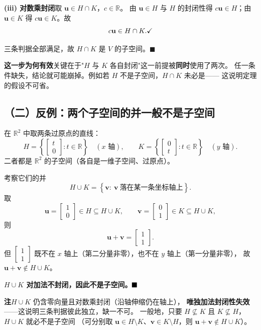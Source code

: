 \documentclass[11pt]{ctexart}
\newcommand{\R}{\mathbb{R}}
\newcommand{\0}{\mathbf{0}}
\begin{document}
\textbf{(iii) 对数乘封闭}\quad 取 $\mathbf u\in H\cap K$，$c\in\mathbb R$。
由 $\mathbf u\in H$ 与 $H$ 的封闭性得 $c\mathbf u\in H$；由 $\mathbf u\in K$ 得 $c\mathbf u\in K$。故
\[
c\mathbf u\in H\cap K . \hfill \checkmark
\]

三条判据全部满足，故 $H\cap K$ 是 $V$ 的子空间。\hfill$\blacksquare$

\begin{keybox}
\textbf{这一步为何有效}\quad 关键在于"$H$ 与 $K$ 各自封闭"这一前提被\textbf{同时}使用了两次。
任一条件缺失，结论就可能崩掉。例如若 $H$ 不是子空间，$H\cap K$ 未必是——
这说明定理的假设不可省。
\end{keybox}

\subsection*{（二）反例：两个子空间的并一般不是子空间}

在 $\R^2$ 中取两条过原点的直线：
\[
H=\left\{\begin{bmatrix}t\\0\end{bmatrix}:t\in\R\right\}
\quad(x\text{ 轴}),\qquad
K=\left\{\begin{bmatrix}0\\t\end{bmatrix}:t\in\R\right\}
\quad(y\text{ 轴}).
\]
二者都是 $\R^2$ 的子空间（各自是一维子空间、过原点）。

考察它们的并
\[
H\cup K=\left\{\mathbf v:\ \mathbf v\ \text{落在某一条坐标轴上}\right\}.
\]
取
\[
\mathbf u=\begin{bmatrix}1\\0\end{bmatrix}\in H\subseteq H\cup K,\qquad
\mathbf v=\begin{bmatrix}0\\1\end{bmatrix}\in K\subseteq H\cup K ,
\]
则
\[
\mathbf u+\mathbf v=\begin{bmatrix}1\\1\end{bmatrix}.
\]
但 $\begin{bmatrix}1\\1\end{bmatrix}$ 既不在 $x$ 轴上（第二分量非零），也不在 $y$ 轴上（第一分量非零），
故 $\mathbf u+\mathbf v\notin H\cup K$。

\textbf{$H\cup K$ 对加法不封闭，因此不是子空间。}$\hfill\blacksquare$

\smallskip
\textbf{注}\quad $H\cup K$ 仍含零向量且对数乘封闭（沿轴伸缩仍在轴上），
\textbf{唯独加法封闭性失效}——这说明三条判据彼此独立，缺一不可。
一般地，只要 $H\nsubseteq K$ 且 $K\nsubseteq H$，$H\cup K$ 就必不是子空间
（可分别取 $\mathbf u\in H\setminus K$、$\mathbf v\in K\setminus H$，则 $\mathbf u+\mathbf v\notin H\cup K$）。
\end{document}
